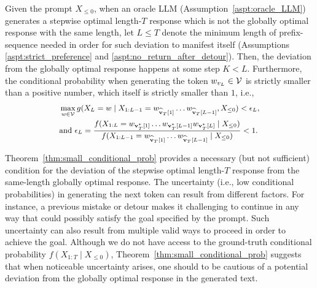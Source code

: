 \begin{theorem}\label{thm:small_conditional_prob}
    Given the prompt $X_{\leq 0}$, when an oracle LLM (Assumption~\ref{aspt:oracle_LLM}) generates a stepwise optimal length-$T$ response which is not the globally optimal response with the same length, let $L \leq T$ denote the minimum length of prefix-sequence needed in order for such deviation to manifest itself (Assumptions \ref{aspt:strict_preference} and \ref{aspt:no_return_after_detour}).
    Then, the deviation from the globally optimal response happens at some step $K < L$.
    Furthermore, the conditional probability when generating the token $w_{v_L} \in \mathcal{V}$ is strictly smaller than a positive number, which itself is strictly smaller than $1$, i.e.,
    \begin{equation*}
        \small
        \begin{split}
             & \max_{w \in \mathcal{V}} g(X_L = w \mid X_{1:L-1} = w_{\widehat{\mathbf{v}}_T[1]} \ldots w_{\widehat{\mathbf{v}}_T[L - 1]}, X_{\leq 0}) < \epsilon_L,                                                                                                         \\
             & \text{and } \epsilon_L = \frac{f(X_{1:L} = w_{\mathbf{v}_T^*[1]} \ldots w_{\mathbf{v}_T^*[L - 1]} w_{\mathbf{v}_T^*[L]} \mid X_{\leq 0})}{f(X_{1:L - 1} = w_{\widehat{\mathbf{v}}_T[1]} \ldots w_{\widehat{\mathbf{v}}_T[L - 1]} \mid X_{\leq 0})} < 1.
        \end{split}
    \end{equation*}
\end{theorem}

Theorem~\ref{thm:small_conditional_prob} provides a necessary (but not sufficient) condition for the deviation of the stepwise optimal length-$T$ response from the same-length globally optimal response.
The uncertainty (i.e., low conditional probabilities) in generating the next token can result from different factors.
For instance, a previous mistake or detour makes it challenging to continue in any way that could possibly satisfy the goal specified by the prompt.
Such uncertainty can also result from multiple valid ways to proceed in order to achieve the goal.
Although we do not have access to the ground-truth conditional probability $f(X_{1:T} \mid X_{\leq 0})$, Theorem~\ref{thm:small_conditional_prob} suggests that when noticeable uncertainty arises, one should to be cautious of a potential deviation from the globally optimal response in the generated text.
